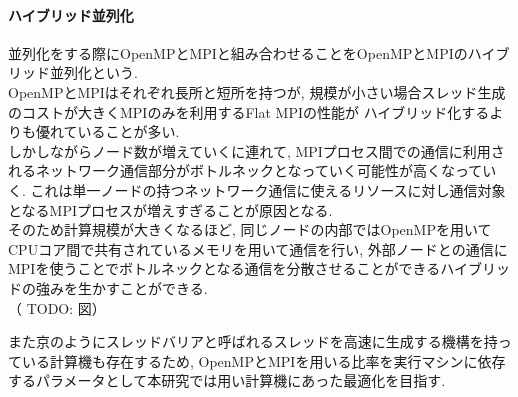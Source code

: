 \paragraph{ハイブリッド並列化}
並列化をする際にOpenMPとMPIと組み合わせることをOpenMPとMPIのハイブリッド並列化という.\\
OpenMPとMPIはそれぞれ長所と短所を持つが, 規模が小さい場合スレッド生成のコストが大きくMPIのみを利用するFlat MPIの性能が
ハイブリッド化するよりも優れていることが多い.\\
しかしながらノード数が増えていくに連れて, MPIプロセス間での通信に利用されるネットワーク通信部分がボトルネックとなっていく可能性が高くなっていく.
これは単一ノードの持つネットワーク通信に使えるリソースに対し通信対象となるMPIプロセスが増えすぎることが原因となる.\\
そのため計算規模が大きくなるほど, 同じノードの内部ではOpenMPを用いてCPUコア間で共有されているメモリを用いて通信を行い,
外部ノードとの通信にMPIを使うことでボトルネックとなる通信を分散させることができるハイブリッドの強みを生かすことができる.\\

（ TODO: 図）

また京のようにスレッドバリアと呼ばれるスレッドを高速に生成する機構を持っている計算機も存在するため,
OpenMPとMPIを用いる比率を実行マシンに依存するパラメータとして本研究では用い計算機にあった最適化を目指す.\\
